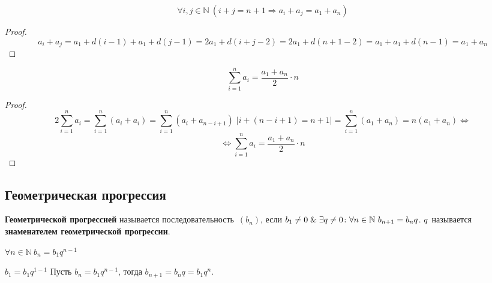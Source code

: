 \begin{lemma}
\begin{equation*}
\forall i, j \in \mathbb N \ (i + j = n + 1 \Rightarrow a_i + a_j = a_1 + a_n)
\end{equation*}
\end{lemma}
\begin{proof}
\begin{equation*}
a_i + a_j =
a_1 + d(i - 1) + a_1 + d(j - 1) =
2 a_1 + d(i + j - 2) =
2 a_1 + d(n + 1 - 2) =
a_1 + a_1 + d(n - 1) =
a_1 + a_n
\end{equation*}
\end{proof}

\begin{theorem}
\begin{equation*}
\sum_{i=1}^n a_i = \frac{a_1 + a_n}2 \cdot n
\end{equation*}
\end{theorem}
\begin{proof}
\begin{equation*}
2 \sum_{i=1}^n a_i =
\sum_{i=1}^n (a_i + a_i) =
\sum_{i=1}^n (a_i + a_{n-i+1}) \;
\left| i + (n - i + 1) = n + 1 \right| =
\sum_{i=1}^n (a_1 + a_n) =
n(a_1 + a_n) \Leftrightarrow
\end{equation*}
\begin{equation*}
\Leftrightarrow \sum_{i=1}^n a_i = \frac{a_1 + a_n}2 \cdot n
\end{equation*}
\end{proof}

\subsection{Геометрическая прогрессия}
 \textbf{Геометрической прогрессией} называется последовательность~$(b_n)$, если $b_1 \neq 0 \mathrel{\&} \exists q \neq 0 \colon \forall n \in \mathbb N \ b_{n+1} = b_n q$.
$q$~называется \textbf{знаменателем геометрической прогрессии}.

\begin{statement}
$\forall n \in \mathbb N \ b_n = b_1 q^{n-1}$
\end{statement}
\begin{proofmathind}
	\indbase $b_1 = b_1 q^{1-1}$
	\indstep Пусть $b_n = b_1 q^{n-1}$, тогда $b_{n+1} = b_n q = b_1 q^n$. \indend
\end{proofmathind}

